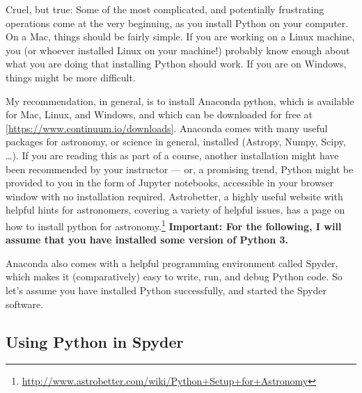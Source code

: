 \documentclass[twocolumn,apj]{openjournal}
\begin{document}
Cruel, but true: Some of the most complicated, and potentially frustrating operations come at the very beginning, as you install Python on your computer. On a Mac, things should be fairly simple. If you are working on a Linux machine, you (or whoever installed Linux on your machine!) probably know enough about what you are doing that installing Python should work. If you are on Windows, things might be more difficult.

My recommendation, in general, is to install Anaconda python, which is available for Mac, Linux, and Windows, and which can be downloaded for free at [\href{https://www.continuum.io/downloads}{https://www.continuum.io/downloads}]. Anaconda comes with many useful packages for astronomy, or science in general, installed (Astropy, Numpy, Scipy, \dots). If you are reading this as part of a course, another installation might have been recommended by your instructor --- or, a promising trend, Python might be provided to you in the form of Jupyter notebooks, accessible in your browser window with no installation required. Astrobetter, a highly useful website with helpful hints for astronomers, covering a variety of helpful issues, has a page on how to install python for astronomy.\footnote{\href{http://www.astrobetter.com/wiki/Python+Setup+for+Astronomy}{http://www.astrobetter.com/wiki/Python+Setup+for+Astronomy}} {\bf Important: For the following, I will assume that you have installed some version of Python 3.}

Anaconda also comes with a helpful programming environment called Spyder, which makes it (comparatively) easy to write, run, and debug Python code. So let's assume you have installed Python successfully, and started the Spyder software.

\subsection{Using Python in Spyder}
\end{document}
